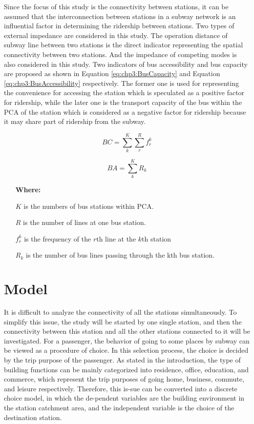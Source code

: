 %
Since the focus of this study is the connectivity between stations, it can be assumed that the interconnection between stations in a subway network is an influential factor in determining the ridership between stations. Two types of external impedance are considered in this study. The operation distance of subway line between two stations is the direct indicator representing the spatial connectivity between two stations. And the impedance of competing modes is also considered in this study. Two indicators of bus accessibility and bus capacity are proposed as shown in Equation \ref{eq:chp3:BusCapacity} and Equation \ref{eq:chp3:BusAccessibility} respectively. The former one is used for representing the convenience for accessing the station which is speculated as a positive factor for ridership, while the later one is the transport capacity of the bus within the PCA of the station which is considered as a negative factor for ridership because it may share part of ridership from the subway.

\begin{equation}
	BC=\sum_{k}^{K}\sum_{r}^{R}f_{r}^{k}
	\label{eq:chp3:BusCapacity}
\end{equation}

\begin{equation}
	BA=\sum_{k}^{K}R_{k}
	\label{eq:chp3:BusAccessibility}
\end{equation}

\begin{enumerate}
	\item[\textbf{Where:}]
	\item[$K$] is the numbers of bus stations within PCA.
	\item[$R$] is the number of lines at one bus station.
	\item[$f_{r}^{k}$] is the frequency of the $r$th line at the $k$th station
	\item[$R_k$] is the number of bus lines passing through the kth bus station.
\end{enumerate}

%
\section{Model}
%
It is difficult to analyze the connectivity of all the stations simultaneously. To simplify this issue, the study will be started by one single station, and then the connectivity between this station and all the other stations connected to it will be investigated. For a passenger, the behavior of going to some places by subway can be viewed as a procedure of choice. In this selection process, the choice is decided by the trip purpose of the passenger. As stated in the introduction, the type of building functions can be mainly categorized into residence, office, education, and commerce, which represent the trip purposes of going home, business, commute, and leisure respectively. Therefore, this is-sue can be converted into a discrete choice model, in which the de-pendent variables are the building environment in the station catchment area, and the independent variable is the choice of the destination station.

